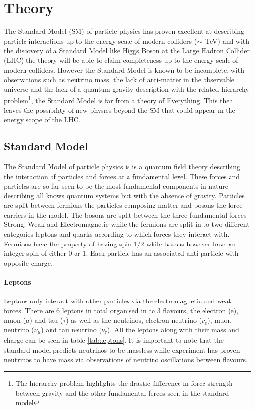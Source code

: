 \chapter{Theory}

    The Standard Model (SM) of particle physics has proven excellent at describing particle interactions up to the energy scale of modern colliders ($\sim$~TeV) and with the discovery of a Standard Model like Higgs Boson at the Large Hadron Collider (LHC) the theory will be able to claim completeness up to the energy scale of modern colliders. However the Standard Model is known to be incomplete, with observations such as neutrino mass, the lack of anti-matter in the observable universe and the lack of a quantum gravity description with the related hierarchy problem\footnote{The hierarchy problem highlights the drastic difference in force strength between gravity and the other fundamental forces seen in the standard model}, the Standard Model is far from a theory of Everything. This then leaves the possibility of new physics beyond the SM that could appear in the energy scope of the LHC.

\section{Standard Model}
    
    The Standard Model of particle physics is is a quantum field theory describing the interaction of particles and forces at a fundamental level. These forces and particles are so far seen to be the most fundamental components in nature describing all knows quantum systems but with the absence of gravity. Particles are split between fermions the particles composing matter and bosons the force carriers in the model. The bosons are split between the three fundamental forces Strong, Weak and Electromagnetic while the fermions are split in to two different categories leptons and quarks according to which forces they interact with. Fermions have the property of having spin 1/2 while bosons however have an integer spin of either 0 or 1. Each particle has an associated anti-particle with opposite charge. 

    \subsubsection*{Leptons}
    Leptons only interact with other particles via the electromagnetic and weak forces. There are 6 leptons in total organised in to 3 flavours, the electron (e), muon ($\mu$) and tau ($\tau$) as well as the neutrinos, electron neutrino ($\nu_{e}$), muon neutrino ($\nu_{\mu}$) and tau neutrino ($\nu_{\tau}$). All the leptons along with their mass and charge can be seen in table \ref{tab:leptons}. It is important to note that the standard model predicts neutrinos to be massless while experiment has proven neutrinos to have mass via observations of neutrino oscillations between flavours. 


